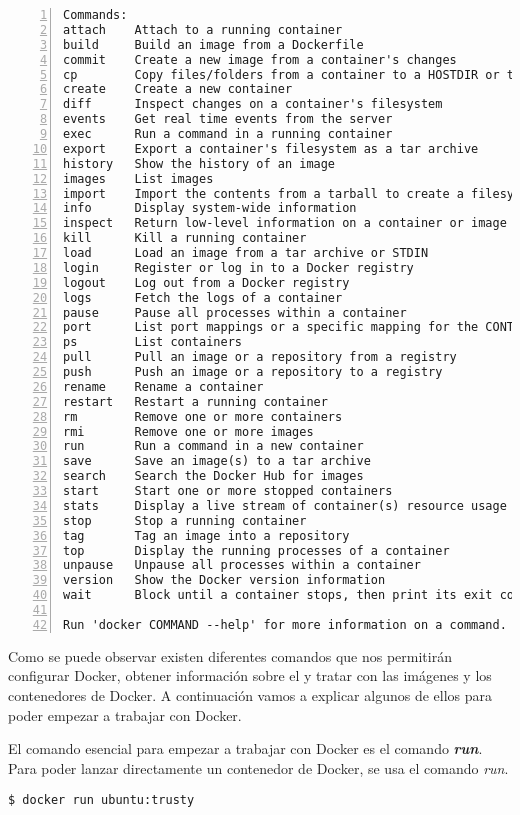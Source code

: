 \begin{lstlisting}[style=consola,numbers=left]
Commands:
attach    Attach to a running container
build     Build an image from a Dockerfile
commit    Create a new image from a container's changes
cp        Copy files/folders from a container to a HOSTDIR or to STDOUT
create    Create a new container
diff      Inspect changes on a container's filesystem
events    Get real time events from the server
exec      Run a command in a running container
export    Export a container's filesystem as a tar archive
history   Show the history of an image
images    List images
import    Import the contents from a tarball to create a filesystem image
info      Display system-wide information
inspect   Return low-level information on a container or image
kill      Kill a running container
load      Load an image from a tar archive or STDIN
login     Register or log in to a Docker registry
logout    Log out from a Docker registry
logs      Fetch the logs of a container
pause     Pause all processes within a container
port      List port mappings or a specific mapping for the CONTAINER
ps        List containers
pull      Pull an image or a repository from a registry
push      Push an image or a repository to a registry
rename    Rename a container
restart   Restart a running container
rm        Remove one or more containers
rmi       Remove one or more images
run       Run a command in a new container
save      Save an image(s) to a tar archive
search    Search the Docker Hub for images
start     Start one or more stopped containers
stats     Display a live stream of container(s) resource usage statistics
stop      Stop a running container
tag       Tag an image into a repository
top       Display the running processes of a container
unpause   Unpause all processes within a container
version   Show the Docker version information
wait      Block until a container stops, then print its exit code

Run 'docker COMMAND --help' for more information on a command.
	\end{lstlisting}
	
	Como se puede observar existen diferentes comandos que nos permitirán configurar Docker, obtener información sobre el y tratar con las imágenes y los contenedores de Docker. A continuación vamos a explicar algunos de ellos para poder empezar a trabajar con Docker. 
	
	El comando esencial para empezar a trabajar con Docker es el comando \textbf{\emph{run}}. Para poder lanzar directamente un contenedor de Docker, se usa el comando \textit{run}.
	
	\begin{lstlisting}[style=consola]
$ docker run ubuntu:trusty
	\end{lstlisting}
	
